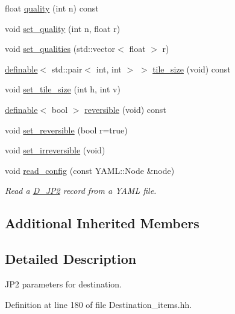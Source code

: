\begin{DoxyCompactItemize}
\item 
float \hyperlink{class_photo_finish_1_1_d___j_p2_acd4d08495e26490954c19f0692713791}{quality} (int n) const
\item 
void \hyperlink{class_photo_finish_1_1_d___j_p2_ab2e790ed4aaf3c752016691a595e63e2}{set\+\_\+quality} (int n, float r)
\item 
void \hyperlink{class_photo_finish_1_1_d___j_p2_aeb47268577b192ccbb511c714a405547}{set\+\_\+qualities} (std\+::vector$<$ float $>$ r)
\item 
\hyperlink{class_photo_finish_1_1definable}{definable}$<$ std\+::pair$<$ int, int $>$ $>$ \hyperlink{class_photo_finish_1_1_d___j_p2_a9d776d8fad747f4a53a96524a30b4fd5}{tile\+\_\+size} (void) const
\item 
void \hyperlink{class_photo_finish_1_1_d___j_p2_a52f1cc8eff29f69c28a884e03b999f89}{set\+\_\+tile\+\_\+size} (int h, int v)
\item 
\hyperlink{class_photo_finish_1_1definable}{definable}$<$ bool $>$ \hyperlink{class_photo_finish_1_1_d___j_p2_a37c09db95aab04268379b9cdf50a785e}{reversible} (void) const
\item 
void \hyperlink{class_photo_finish_1_1_d___j_p2_a8cc8dc0e2675aa43c42996b7889c7288}{set\+\_\+reversible} (bool r=true)
\item 
void \hyperlink{class_photo_finish_1_1_d___j_p2_a58af16eb399eab6cfcf69095c8afe6d5}{set\+\_\+irreversible} (void)
\item 
void \hyperlink{class_photo_finish_1_1_d___j_p2_ae4a9dac272d2f89cd28326a78f79bad9}{read\+\_\+config} (const Y\+A\+M\+L\+::\+Node \&node)
\begin{DoxyCompactList}\small\item\em Read a \hyperlink{class_photo_finish_1_1_d___j_p2}{D\+\_\+\+J\+P2} record from a Y\+A\+ML file. \end{DoxyCompactList}\end{DoxyCompactItemize}
\subsection*{Additional Inherited Members}


\subsection{Detailed Description}
J\+P2 parameters for destination. 

Definition at line 180 of file Destination\+\_\+items.\+hh.



